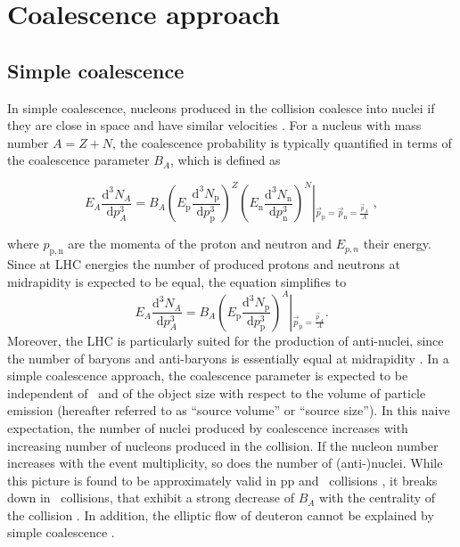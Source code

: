\documentclass[a4paper,11pt]{scrartcl} %
\begin{document}
\section{Coalescence approach} \label{sec:coalescence}

\subsection{Simple coalescence}
In simple coalescence, nucleons produced in the collision coalesce into nuclei if they are close in space and have similar velocities \cite{Butler:1963,Kapusta:1980}. For a nucleus with mass number $A = Z + N$, the coalescence probability is typically quantified in terms of the coalescence parameter $B_{A}$, which is defined as

\begin{equation}
E_{A}\frac{\mathrm{d}^{3}N_{A}}{\mathrm{d}p_{A}^{3}}=B_{A}{\left(E_{\mathrm{p}}\frac{\mathrm{d}^{3}N_{\mathrm{p}}}{\mathrm{d}p_{\mathrm{p}}^{3}}\right)^{Z}\left(E_{\mathrm{n}}\frac{\mathrm{d}^{3}N_{\mathrm{n}}}{\mathrm{d}p_{\mathrm{n}}^{3}}\right)^{N}}\left\vert_{\vec{p}_{\mathrm{p}}=\vec{p}_{\mathrm{n}}=\frac{\vec{p}_{A}}{A}} \right.\;,    
\label{eq:BA}
\end{equation}

\noindent where $p_{\mathrm{p,n}}$ are the momenta of the proton and neutron and $E_{p,n}$ their energy.
Since at LHC energies the number of produced protons and neutrons at midrapidity is expected to be equal, the equation simplifies to 
\begin{equation}
E_{A}\frac{\mathrm{d}^{3}N_{A}}{\mathrm{d}p_{A}^{3}}=B_{A}{\left(E_{\mathrm{p}}\frac{\mathrm{d}^{3}N_{\mathrm{p}}}{\mathrm{d}p_{\mathrm{p}}^{3}}\right)^{A}}\left\vert_{\vec{p}_{\mathrm{p}}=\frac{\vec{p}_{A}}{A}} \right..
\label{eq:BA}
\end{equation}
%
Moreover, the LHC is particularly suited for the production of anti-nuclei, since the number of baryons and anti-baryons is essentially equal at midrapidity \cite{Abbas:2013rua}.
In a simple coalescence approach, the coalescence parameter is expected to be independent of \pt~and of the object size with respect to the volume of particle emission (hereafter referred to as ``source volume'' or ``source size'').
In this naive expectation, the number of nuclei produced by coalescence increases with increasing number of nucleons produced in the collision. If the nucleon number increases with the event multiplicity, so does the number of (anti-)nuclei. 
While this picture is found to be approximately valid in pp and \pPb~collisions \cite{ALICE:nucleipp2017, ALICE:nucleipPb2018}, it breaks down in \PbPb~collisions, that exhibit a strong decrease of $B_{A}$ with the centrality of the collision \cite{ALICE:deuteronppPbPb2015}. 
In addition, the elliptic flow of deuteron cannot be explained by simple coalescence \cite{ALICE:deuteronflow2017}. 
\end{document}
